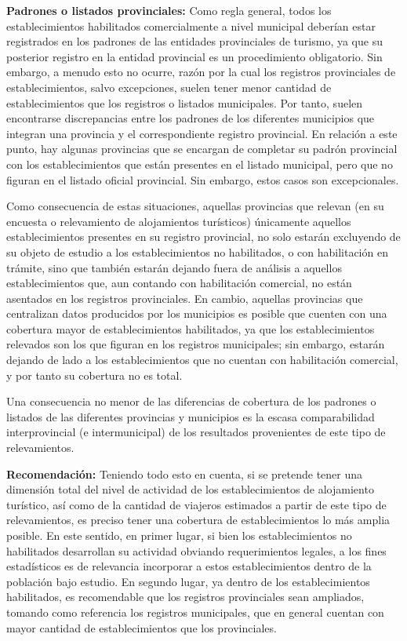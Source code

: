 \documentclass[
]{book}
\begin{document}
\textbf{Padrones o listados provinciales:} Como regla general, todos los establecimientos habilitados comercialmente a nivel municipal deberían estar registrados en los padrones de las entidades provinciales de turismo, ya que su posterior registro en la entidad provincial es un procedimiento obligatorio. Sin embargo, a menudo esto no ocurre, razón por la cual los registros provinciales de establecimientos, salvo excepciones, suelen tener menor cantidad de establecimientos que los registros o listados municipales. Por tanto, suelen encontrarse discrepancias entre los padrones de los diferentes municipios que integran una provincia y el correspondiente registro provincial. En relación a este punto, hay algunas provincias que se encargan de completar su padrón provincial con los establecimientos que están presentes en el listado municipal, pero que no figuran en el listado oficial provincial. Sin embargo, estos casos son excepcionales.

Como consecuencia de estas situaciones, aquellas provincias que relevan (en su encuesta o relevamiento de alojamientos turísticos) únicamente aquellos establecimientos presentes en su registro provincial, no solo estarán excluyendo de su objeto de estudio a los establecimientos no habilitados, o con habilitación en trámite, sino que también estarán dejando fuera de análisis a aquellos establecimientos que, aun contando con habilitación comercial, no están asentados en los registros provinciales. En cambio, aquellas provincias que centralizan datos producidos por los municipios es posible que cuenten con una cobertura mayor de establecimientos habilitados, ya que los establecimientos relevados son los que figuran en los registros municipales; sin embargo, estarán dejando de lado a los establecimientos que no cuentan con habilitación comercial, y por tanto su cobertura no es total.

Una consecuencia no menor de las diferencias de cobertura de los padrones o listados de las diferentes provincias y municipios es la escasa comparabilidad interprovincial (e intermunicipal) de los resultados provenientes de este tipo de relevamientos.

\textbf{Recomendación:} Teniendo todo esto en cuenta, si se pretende tener una dimensión total del nivel de actividad de los establecimientos de alojamiento turístico, así como de la cantidad de viajeros estimados a partir de este tipo de relevamientos, es preciso tener una cobertura de establecimientos lo más amplia posible. En este sentido, en primer lugar, si bien los establecimientos no habilitados desarrollan su actividad obviando requerimientos legales, a los fines estadísticos es de relevancia incorporar a estos establecimientos dentro de la población bajo estudio. En segundo lugar, ya dentro de los establecimientos habilitados, es recomendable que los registros provinciales sean ampliados, tomando como referencia los registros municipales, que en general cuentan con mayor cantidad de establecimientos que los provinciales.
\end{document}
